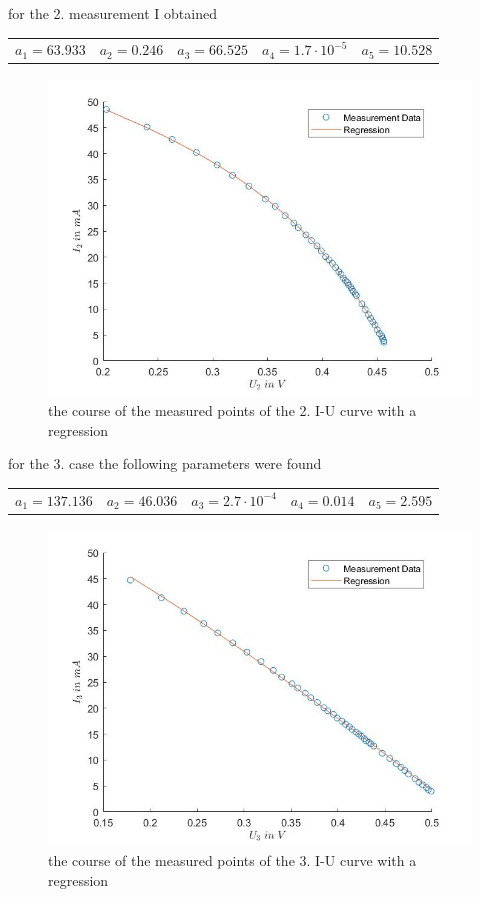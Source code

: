 \documentclass[a4paper, 12pt]{scrartcl}
\begin{document}
for the 2. measurement I obtained\newline\newline
\begin{tabular}{ccccc}$a_1=63.933$&$a_2=0.246$&$a_3=66.525$&$a_4=1.7\cdot10^{-5}$&$a_5=10.528$\end{tabular}
\begin{figure}[H]\includegraphics[scale=0.4]{gef. KL 2}\caption{the course of the measured points of the 2. I-U curve with a regression}\end{figure}\newpage
for the 3. case the following parameters were found\newline\newline
\begin{tabular}{ccccc}$a_1=137.136$&$a_2=46.036$&$a_3=2.7\cdot10^{-4}$&$a_4=0.014$&$a_5=2.595$\end{tabular}
\begin{figure}[H]\includegraphics[scale=0.4]{gef. KL 3}\caption{the course of the measured points of the 3. I-U curve with a regression}\end{figure}
\end{document}
